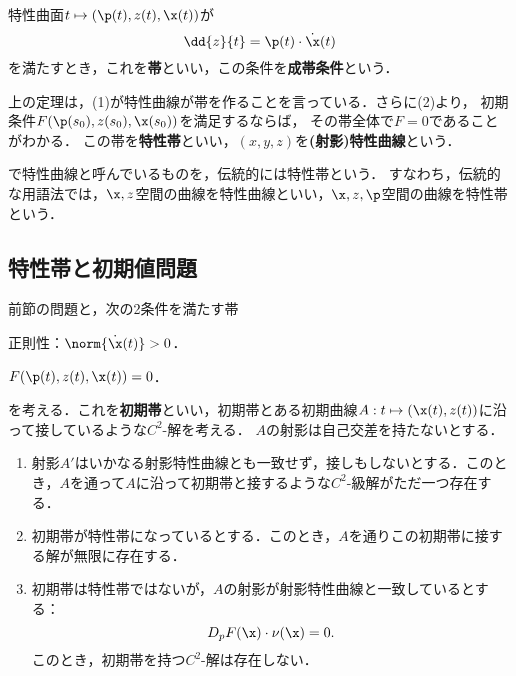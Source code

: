 \documentclass[uplatex,dvipdfmx]{jsreport}
\begin{document}
\begin{definition}
    特性曲面$t\mapsto(\p(t),z(t),\x(t))$が
    \[\dd{z}{t}=\p(t)\cdot\dot{\x}(t)\]
    を満たすとき，これを\textbf{帯}といい，この条件を\textbf{成帯条件}という．
\end{definition}
\begin{remarks}
    上の定理は，(1)が特性曲線が帯を作ることを言っている．さらに(2)より，
    初期条件$F(\p(s_0),z(s_0),\x(s_0))$を満足するならば，
    その帯全体で$F=0$であることがわかる．
    この帯を\textbf{特性帯}といい，$(x,y,z)$を\textbf{(射影)特性曲線}という．
\end{remarks}
\begin{remark}
    \cite{Evans}で特性曲線と呼んでいるものを，伝統的には特性帯という．
    すなわち，伝統的な用語法では，$\x,z$空間の曲線を特性曲線といい，$\x,z,\p$空間の曲線を特性帯という．
\end{remark}

\subsection{特性帯と初期値問題}

\begin{problem}
    前節の問題と，次の2条件を満たす帯
    \begin{enumerate}[{[A}1{]}]
        \item 正則性：$\norm{\dot{\x}(t)}>0$．
        \item $F(\p(t),z(t),\x(t))=0$．
    \end{enumerate}
    を考える．これを\textbf{初期帯}といい，初期帯とある初期曲線$A:t\mapsto(\x(t),z(t))$に沿って接しているような$C^2$-解を考える．
    $A$の射影は自己交差を持たないとする．
\end{problem}

\begin{theorem}\mbox{}\label{thm-initial-value-problem-of-fully-nonlinear-1st-order}
    \begin{enumerate}
        \item 射影$A'$はいかなる射影特性曲線とも一致せず，接しもしないとする．このとき，$A$を通って$A$に沿って初期帯と接するような$C^2$-級解がただ一つ存在する．
        \item 初期帯が特性帯になっているとする．このとき，$A$を通りこの初期帯に接する解が無限に存在する．
        \item 初期帯は特性帯ではないが，$A$の射影が射影特性曲線と一致しているとする：
        \[D_pF(\x)\cdot\nu(\x)=0.\]
        このとき，初期帯を持つ$C^2$-解は存在しない．
    \end{enumerate}
\end{theorem}
\end{document}
